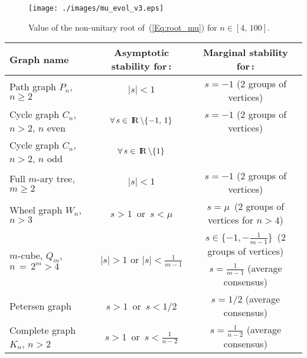 \documentclass[letterpaper,9pt,twocolumn]{autart}
\newcommand{\rr}{\mathop{{\rm I}\mskip-4.0mu{\rm R}}\nolimits}
\begin{document}
\begin{figure}[t!]
       \begin{center}
           \texttt{[image: ./images/mu\_evol\_v3.eps]}
\caption{Value of the non-unitary root of~(\ref{Eq:root_mu}) for $n \in [4,\,100]$.}
           \label{FIG:Root}
       \end{center}
\end{figure}
\begin{table*}[t!]
\renewcommand{\arraystretch}{1.42}
\begin{center}
  \begin{tabular}{|l|c|c|} \hline
    \textbf{Graph name} & \textbf{Asymptotic stability for\,:}
    & \textbf{Marginal stability for\,:}\\
    \hline\hline
    Path graph $P_n$, $n \geq 2$ & $|s| < 1$ & $s = -1$\; (2 groups of vertices)\vspace{0.01cm}\\
    \hline
    Cycle graph $C_n$, $n > 2$, $n$ even & $\forall\, s \in\,
    \rr\setminus \{-1,\,1\}$ &\hspace{0.01cm} $s = -1$\; (2 groups of vertices)\vspace{0.01cm}\\
    \hline
    Cycle graph $C_n$, $n > 2$, $n$ odd & $\forall\, s \in\, \rr\setminus \{1\}$ & \vspace{0.01cm}\\
    \hline
    Full $m$-ary tree, $m \geq 2$ & $|s| < 1$ & $s = -1$\; (2 groups of vertices)\vspace{0.01cm}\\
    \hline
    Wheel graph $W_n$, $n > 3$ &  $s > 1$ \,or\, $s < \mu$ & $s =
    \mu$\, (2 groups of vertices for $n > 4$)\vspace{0.01cm}\\
    \hline
    \multirow{2}{*}{$m$-cube, $Q_m$, $n \,=\, 2^m > 4$} &  \multirow{2}{*}{$|s| > 1$ or $|s| < \frac{1}{m-1}$}
    & $s \in \{-1, -\frac{1}{m-1}\}$\, (2 groups of vertices)\vspace{0.01cm}\\
    & & $s = \frac{1}{m-1}$\; (average consensus)\vspace{0.01cm}\\
    \hline
    Petersen graph & $s > 1$ \,or\, $s < 1/2$ & $s = 1/2$\; (average consensus) \vspace{0.01cm}\\
    \hline
    Complete graph $K_n$, $n > 2$ & $s > 1$ \,or\, $s < \frac{1}{n-2}$ & $s = \frac{1}{n-2}$\; (average consensus) \vspace{0.01cm}\\

\end{tabular}
\end{center}
\end{table*}
\end{document}
